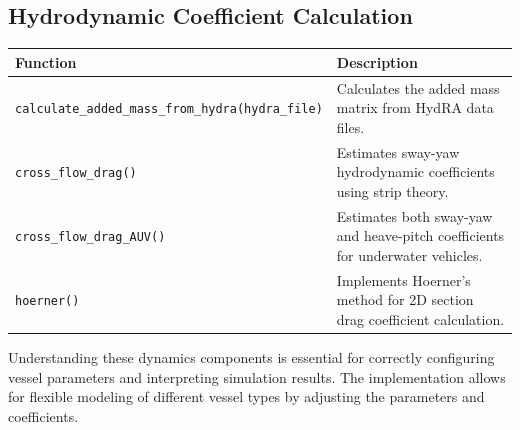 \documentclass[
  letterpaper,
  DIV=11,
  numbers=noendperiod]{scrreprt}
\begin{document}
\subsection*{Hydrodynamic Coefficient
Calculation}\label{hydrodynamic-coefficient-calculation}

\begin{longtable}[]{@{}
  >{\raggedright\arraybackslash}p{}
  >{\raggedright\arraybackslash}p{}@{}}
\toprule\noalign{}
\begin{minipage}[b]{\linewidth}\raggedright
Function
\end{minipage} & \begin{minipage}[b]{\linewidth}\raggedright
Description
\end{minipage} \\
\midrule\noalign{}
\endhead
\bottomrule\noalign{}
\endlastfoot
\texttt{calculate\_added\_mass\_from\_hydra(hydra\_file)} & Calculates
the added mass matrix from HydRA data files. \\
\texttt{cross\_flow\_drag()} & Estimates sway-yaw hydrodynamic
coefficients using strip theory. \\
\texttt{cross\_flow\_drag\_AUV()} & Estimates both sway-yaw and
heave-pitch coefficients for underwater vehicles. \\
\texttt{hoerner()} & Implements Hoerner's method for 2D section drag
coefficient calculation. \\
\end{longtable}

\begin{tcolorbox}[enhanced jigsaw, colback=white, toptitle=1mm, colframe=quarto-callout-note-color-frame, rightrule=.15mm, breakable, title=\textcolor{quarto-callout-note-color}{\faInfo}\hspace{0.5em}{Note}, toprule=.15mm, opacitybacktitle=0.6, opacityback=0, coltitle=black, leftrule=.75mm, colbacktitle=quarto-callout-note-color!10!white, arc=.35mm, titlerule=0mm, bottomtitle=1mm, bottomrule=.15mm, left=2mm]

Understanding these dynamics components is essential for correctly
configuring vessel parameters and interpreting simulation results. The
implementation allows for flexible modeling of different vessel types by
adjusting the parameters and coefficients.

\end{tcolorbox}
\end{document}
